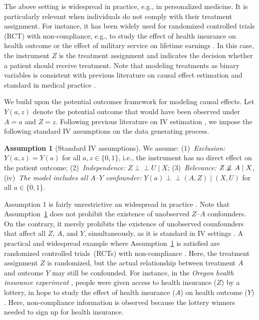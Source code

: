 \documentclass[nonatbib]{article}
\newcommand{\indep}{\perp \!\!\! \perp}
\newcommand{\indepnot}{\not\!\perp\!\!\!\perp}
\theoremstyle{definition}
\newtheorem{assumption}{Assumption}
\theoremstyle{plain}
\begin{document}
The above setting is widespread in practice, e.g., in personalized medicine. It is particularly relevant when individuals do not comply with their treatment assignment. For instance, it has been widely used for randomized controlled trials (RCT) with non-compliance, e.g., to study the effect of health insurance on health outcome \cite{Finkelstein.2012} or the effect of military service on lifetime earnings \cite{Angrist.1990}. In this case, the instrument $Z$ is the treatment assignment and indicates the decision whether a patient should receive treatment. Note that modeling treatments as binary variables is consistent with previous literature on causal effect estimation and standard in medical practice \cite{Robins.2000}. 

We build upon the potential outcomes framework \cite{Rubin.1974} for modeling causal effects. Let $Y(a,z)$ denote the potential outcome that would have been observed under $A=a$ and $Z=z$. Following previous literature on IV estimation \cite{Wang.2018}, we impose the following standard IV assumptions on the data generating process.

\begin{assumption}[Standard IV assumptions]
\label{ass:iv}
We assume: (1)~\emph{Exclusion:} $Y(a,z) = Y(a)$ for all $a, z \in \{0,1\}$, i.e., the instrument has no direct effect on the patient outcome; (2)~\emph{Independence:} $Z \indep U \mid X$; (3)~\emph{Relevance:} $Z \indepnot A \mid X$, (iv)~\emph{The model includes all $A$--$Y$ confounder:} $Y(a) \indep (A, Z) \mid (X, U)$ for all $a \in \{0,1\}$.
\end{assumption}

Assumption 1 is fairly unrestrictive an widespread in practice \cite{Angrist.1990, Angrist.1991, Imbens.1994}. Note that Assumption~\ref{ass:iv} does not prohibit the existence of unobserved $Z$--$A$ confounders. On the contrary, it merely prohibits the existence of unobserved counfounders that affect all $Z$, $A$, and $Y$, simultaneously, as it is standard in IV settings \cite{Wooldridge.2013}. A practical and widespread example where Assumption~\ref{ass:iv} is satisfied are randomized controlled trials~(RCTs) with non-compliance \cite{Imbens.1994}. Here, the treatment assignment $Z$ is randomized, but the actual relationship between treatment $A$ and outcome $Y$ may still be confounded. For instance, in the \emph{Oregon health insurance experiment} \cite{Finkelstein.2012}, people were given access to health insurance ($Z$) by a lottery, in hope to study the effect of health insurance ($A$) on health outcome ($Y$) \cite{Finkelstein.2012}. Here, non-compliance information is observed because the lottery winners needed to sign up for health insurance.
\end{document}
